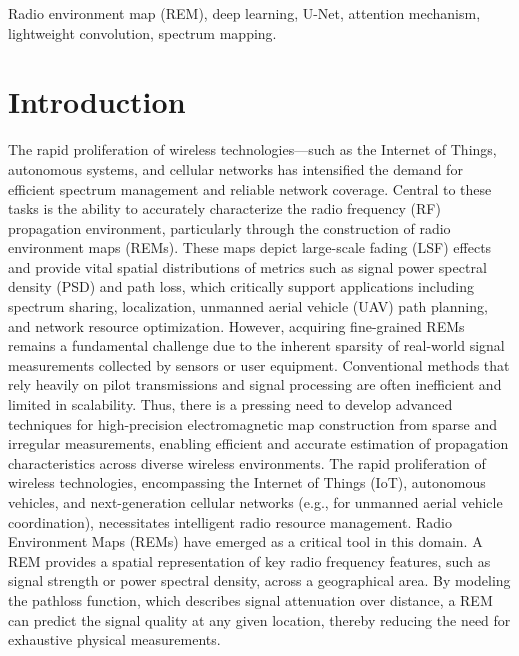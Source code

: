 \documentclass[conference]{IEEEtran}
\begin{document}
\begin{IEEEkeywords}
Radio environment map (REM), deep learning, U-Net, attention mechanism, lightweight convolution, spectrum mapping.
\end{IEEEkeywords}
\section{Introduction}



The rapid proliferation of wireless technologies—such as the Internet of Things,
autonomous systems, and cellular networks has intensified the demand for efficient 
spectrum management and reliable network coverage. Central to these tasks is the 
ability to accurately characterize the radio frequency (RF) propagation environment, 
particularly through the construction of radio environment maps (REMs). These maps 
depict large-scale fading (LSF) effects and provide vital spatial distributions of 
metrics such as signal power spectral density (PSD) and path loss, which critically 
support applications including spectrum sharing, localization, unmanned aerial vehicle 
(UAV) path planning, and network resource optimization. However, acquiring fine-grained 
REMs remains a fundamental challenge due to the inherent sparsity of real-world signal 
measurements collected by sensors or user equipment. Conventional methods that rely 
heavily on pilot transmissions and signal processing are often inefficient and limited 
in scalability. Thus, there is a pressing need to develop advanced techniques for 
high-precision electromagnetic map construction from sparse and irregular measurements, 
enabling efficient and accurate estimation of propagation characteristics across 
diverse wireless environments.
The rapid proliferation of wireless technologies, encompassing the Internet of Things (IoT), 
autonomous vehicles, and next-generation cellular networks (e.g., for unmanned aerial vehicle coordination), 
necessitates intelligent radio resource management. Radio Environment Maps (REMs) have emerged as a critical 
tool in this domain. A REM provides a spatial representation of key radio frequency features, such as signal 
strength or power spectral density, across a geographical area. By modeling the pathloss function, which 
describes signal attenuation over distance, a REM can predict the signal quality at any given location, 
thereby reducing the need for exhaustive physical measurements.
\end{document}

